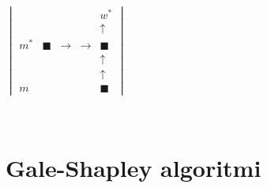 \documentclass[finnish]{tktltiki2}
\theoremstyle{definition}
\theoremstyle{remark}
\begin{document}
$\begin{vmatrix}
  & & & & w^{*}
  \\
  & & & & \uparrow
  \\
  m^{*} & \blacksquare & \rightarrow & \rightarrow & \blacksquare
  \\
  & & & & \uparrow
  \\
  & & & & \uparrow
  \\
  m& & & & \blacksquare
\end{vmatrix}$

\\



\section{Gale-Shapley algoritmi}




%
%
% 
%



\end{document}
